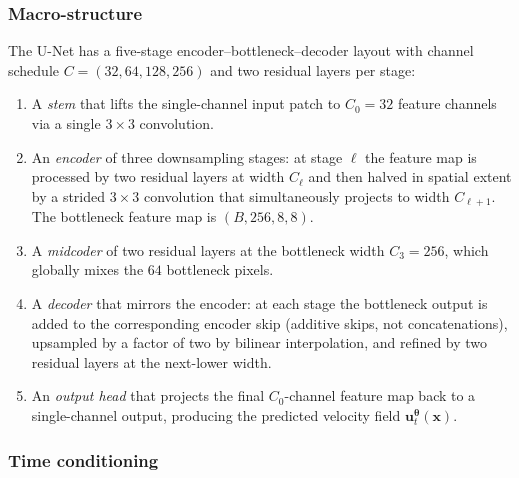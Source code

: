 \documentclass[11pt]{article}
\DeclareRobustCommand{\uvec}{\bm{u}}
\DeclareRobustCommand{\xvec}{\bm{x}}
\DeclareRobustCommand{\thetavec}{\bm{\theta}}
\theoremstyle{definition}
\begin{document}
\subsubsection{Macro-structure}

The U-Net has a five-stage encoder--bottleneck--decoder layout with channel schedule $C=(32,64,128,256)$ and two residual layers per stage:
\begin{enumerate}[leftmargin=2.0em,itemsep=0.15em]
  \item A \emph{stem} that lifts the single-channel input patch to $C_0=32$ feature channels via a single $3\!\times\!3$ convolution.
  \item An \emph{encoder} of three downsampling stages: at stage $\ell$ the feature map is processed by two residual layers at width $C_\ell$ and then halved in spatial extent by a strided $3\!\times\!3$ convolution that simultaneously projects to width $C_{\ell+1}$. The bottleneck feature map is $(B,256,8,8)$.
  \item A \emph{midcoder} of two residual layers at the bottleneck width $C_3=256$, which globally mixes the $64$ bottleneck pixels.
  \item A \emph{decoder} that mirrors the encoder: at each stage the bottleneck output is added to the corresponding encoder skip (additive skips, not concatenations), upsampled by a factor of two by bilinear interpolation, and refined by two residual layers at the next-lower width.
  \item An \emph{output head} that projects the final $C_0$-channel feature map back to a single-channel output, producing the predicted velocity field $\uvec_t^{\thetavec}(\xvec)$.
\end{enumerate}

\subsubsection{Time conditioning}
\end{document}
